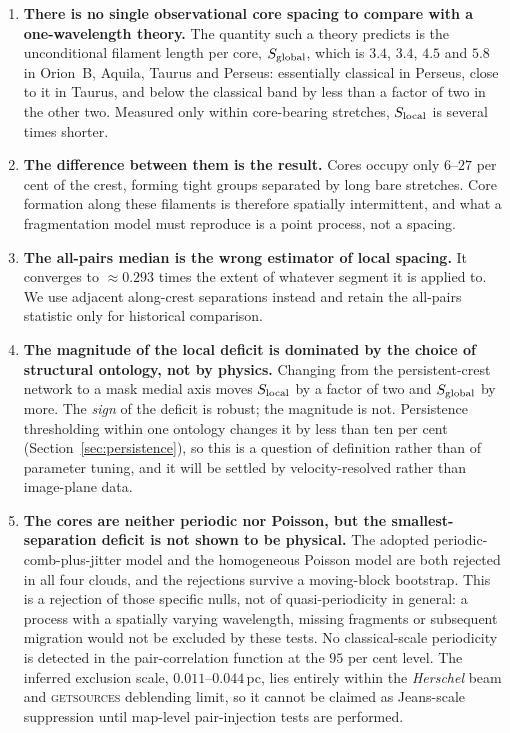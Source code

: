 \documentclass[usenatbib,twoside,twocolumn]{mnras}
\begin{document}
\begin{enumerate}\setlength{\itemsep}{2pt}
\item \textbf{There is no single observational core spacing to compare with a one-wavelength theory.} The quantity such a theory predicts is the unconditional filament length per core, $S_{\rm global}$, which is $3.4$, $3.4$, $4.5$ and $5.8$ in Orion~B, Aquila, Taurus and Perseus: essentially classical in Perseus, close to it in Taurus, and below the classical band by less than a factor of two in the other two. Measured only within core-bearing stretches, $S_{\rm local}$ is several times shorter.
\item \textbf{The difference between them is the result.} Cores occupy only $6$--$27$ per cent of the crest, forming tight groups separated by long bare stretches. Core formation along these filaments is therefore spatially intermittent, and what a fragmentation model must reproduce is a point process, not a spacing.
\item \textbf{The all-pairs median is the wrong estimator of local spacing.} It converges to $\approx0.293$ times the extent of whatever segment it is applied to. We use adjacent along-crest separations instead and retain the all-pairs statistic only for historical comparison.
\item \textbf{The magnitude of the local deficit is dominated by the choice of structural ontology, not by physics.} Changing from the persistent-crest network to a mask medial axis moves $S_{\rm local}$ by a factor of two and $S_{\rm global}$ by more. The \emph{sign} of the deficit is robust; the magnitude is not. Persistence thresholding within one ontology changes it by less than ten per cent (Section~\ref{sec:persistence}), so this is a question of definition rather than of parameter tuning, and it will be settled by velocity-resolved rather than image-plane data.
\item \textbf{The cores are neither periodic nor Poisson, but the smallest-separation deficit is not shown to be physical.} The adopted periodic-comb-plus-jitter model and the homogeneous Poisson model are both rejected in all four clouds, and the rejections survive a moving-block bootstrap. This is a rejection of those specific nulls, not of quasi-periodicity in general: a process with a spatially varying wavelength, missing fragments or subsequent migration would not be excluded by these tests. No classical-scale periodicity is detected in the pair-correlation function at the $95$ per cent level. The inferred exclusion scale, $0.011$--$0.044$\,pc, lies entirely within the \textit{Herschel} beam and \textsc{getsources} deblending limit, so it cannot be claimed as Jeans-scale suppression until map-level pair-injection tests are performed.

\end{enumerate}
\end{document}
